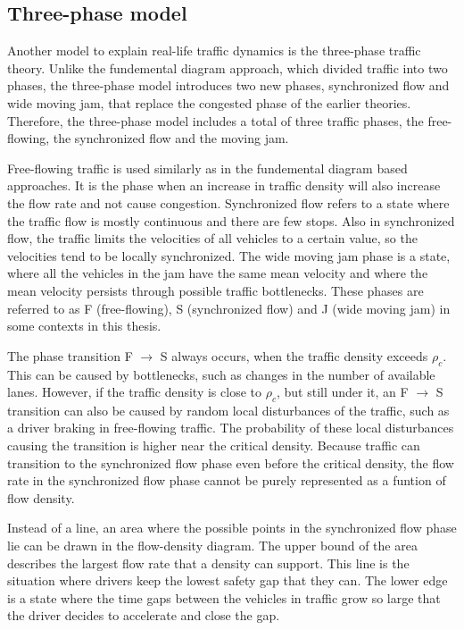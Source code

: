 \documentclass[english, 12pt, a4paper, elec, utf8, pdfa, online]{aaltothesis}
\begin{document}
\subsection{Three-phase model}

Another model to explain real-life traffic dynamics is the three-phase traffic theory. Unlike the fundemental diagram approach, which divided traffic into two phases, the three-phase model introduces two new phases, synchronized flow and wide moving jam, that replace the congested phase of the earlier theories. Therefore, the three-phase model includes a total of three traffic phases, the free-flowing, the synchronized flow and the moving jam.

Free-flowing traffic is used similarly as in the fundemental diagram based approaches. It is the phase when an increase in traffic density will also increase the flow rate and not cause congestion. Synchronized flow refers to a state where the traffic flow is mostly continuous and there are few stops. Also in synchronized flow, the traffic limits the velocities of all vehicles to a certain value, so the velocities tend to be locally synchronized. The wide moving jam phase is a state, where all the vehicles in the jam have the same mean velocity and where the mean velocity persists through possible traffic bottlenecks. These phases are referred to as F (free-flowing), S (synchronized flow) and J (wide moving jam) in some contexts in this thesis.

The phase transition F $\to$ S always occurs, when the traffic density exceeds $\rho_c$. This can be caused by bottlenecks, such as changes in the number of available lanes. However, if the traffic density is close to $\rho_c$, but still under it, an F $\to$ S transition can also be caused by random local disturbances of the traffic, such as a driver braking in free-flowing traffic. The probability of these local disturbances causing the transition is higher near the critical density. Because traffic can transition to the synchronized flow phase even before the critical density, the flow rate in the synchronized flow phase cannot be purely represented as a funtion of flow density.

Instead of a line, an area where the possible points in the synchronized flow phase lie can be drawn in the flow-density diagram. The upper bound of the area describes the largest flow rate that a density can support. This line is the situation where drivers keep the lowest safety gap that they can. The lower edge is a state where the time gaps between the vehicles in traffic grow so large that the driver decides to accelerate and close the gap.
\end{document}
